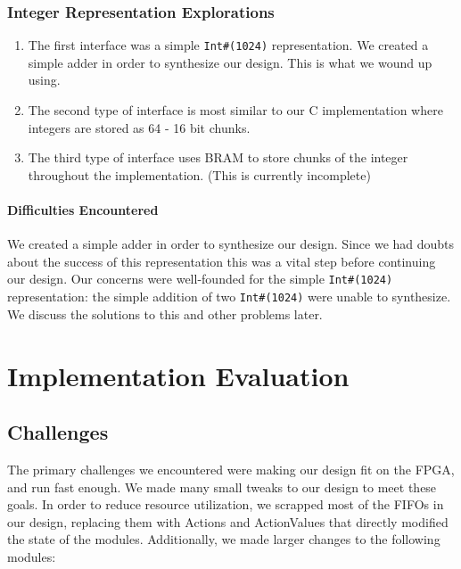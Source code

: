 \documentclass[a4paper,11pt]{report}
\begin{document}
\subsection{Integer Representation Explorations}
\begin{enumerate}
\item The first interface was a simple {\tt Int\#(1024)} representation. We created a simple adder in order to synthesize our design.
      This is what we wound up using.
\item The second type of interface is most similar to our C implementation where integers are stored as 64 - 16 bit chunks.
\item The third type of interface uses BRAM to store chunks of the integer throughout the implementation. (This is currently incomplete)
\end{enumerate}
\subsubsection{Difficulties Encountered}
We created a simple adder in order to synthesize our design.  Since we had doubts about the success of this representation this was a vital step before continuing our design. Our concerns were well-founded for the simple {\tt Int\#(1024)} representation: the simple addition of two {\tt Int\#(1024)} were unable to synthesize.
We discuss the solutions to this and other problems later.
\chapter*{Implementation Evaluation}

\section{Challenges}
The primary challenges we encountered were making our design fit on the FPGA, and run fast enough.
We made many small tweaks to our design to meet these goals.
In order to reduce resource utilization, we scrapped most of the FIFOs in our design,
replacing them with Actions and ActionValues that directly modified the state of the modules.
Additionally, we made larger changes to the following modules:
\end{document}
